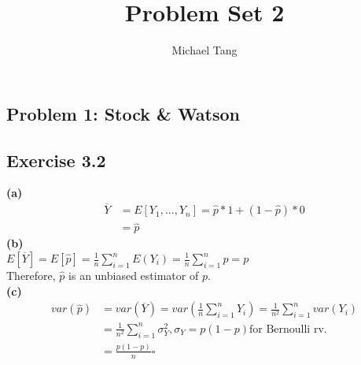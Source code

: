 \documentclass[fleqn]{article}
\title{Problem Set 2}
\author{Michael Tang}
\begin{document}
\maketitle
{}
\begin{adjustwidth}{-2cm}{-2cm}

\section{Problem 1: Stock \& Watson}
\subsection{Exercise 3.2}
\textbf{(a)}
\begin{align*}
\overline{Y} &= E\left[Y_{1},...,Y_{n}\right] = \hat{p}*1 + \left(1-\hat{p}\right)*0\\
&= \hat{p}
\end{align*}
\textbf{(b)}\\
$E\left[\overline{Y}\right] = E\left[\hat{p}\right] = \frac{1}{n}\sum_{i=1}^{n}E\left(Y_{i}\right) = \frac{1}{n}\sum_{i=1}^{n}p = p$\\
Therefore, $\hat{p}$ is an unbiased estimator of $p$.\\
\textbf{(c)}
\begin{align*}
var\left(\hat{p}\right) &= var\left(\overline{Y}\right) = var\left(\frac{1}{n}\sum_{i=1}^{n}Y_{i}\right) = \frac{1}{n^{2}}\sum_{i=1}^{n}var\left(Y_{i}\right)\\
&= \frac{1}{n^{2}}\sum_{i=1}^{n}\sigma_{Y}^2, \sigma_{Y} = p\left(1-p\right) \text{for Bernoulli rv.}\\
&= \frac{p\left(1-p\right)}{n}  \square
\end{align*}

\end{adjustwidth}
\end{document}

